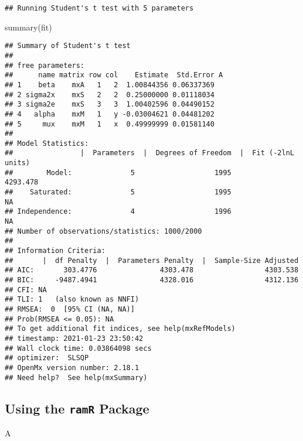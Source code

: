 \documentclass[
]{book}
\newenvironment{Shaded}{\begin{snugshade}}{\end{snugshade}}
\newcommand{\FunctionTok}[1]{\textcolor[rgb]{0.00,0.00,0.00}{#1}}
\newcommand{\NormalTok}[1]{#1}
\theoremstyle{definition}
\theoremstyle{definition}
\theoremstyle{definition}
\theoremstyle{remark}
\begin{document}
\begin{verbatim}
## Running Student's t test with 5 parameters
\end{verbatim}

\begin{Shaded}
\begin{Highlighting}[]
\FunctionTok{summary}\NormalTok{(fit)}
\end{Highlighting}
\end{Shaded}

\begin{verbatim}
## Summary of Student's t test 
##  
## free parameters:
##      name matrix row col    Estimate  Std.Error A
## 1    beta    mxA   1   2  1.00844356 0.06337369  
## 2 sigma2x    mxS   2   2  0.25000000 0.01118034  
## 3 sigma2e    mxS   3   3  1.00402596 0.04490152  
## 4   alpha    mxM   1   y -0.03004621 0.04481202  
## 5     mux    mxM   1   x  0.49999999 0.01581140  
## 
## Model Statistics: 
##                |  Parameters  |  Degrees of Freedom  |  Fit (-2lnL units)
##        Model:              5                   1995              4293.478
##    Saturated:              5                   1995                    NA
## Independence:              4                   1996                    NA
## Number of observations/statistics: 1000/2000
## 
## Information Criteria: 
##       |  df Penalty  |  Parameters Penalty  |  Sample-Size Adjusted
## AIC:       303.4776               4303.478                 4303.538
## BIC:     -9487.4941               4328.016                 4312.136
## CFI: NA 
## TLI: 1   (also known as NNFI) 
## RMSEA:  0  [95% CI (NA, NA)]
## Prob(RMSEA <= 0.05): NA
## To get additional fit indices, see help(mxRefModels)
## timestamp: 2021-01-23 23:50:42 
## Wall clock time: 0.03864098 secs 
## optimizer:  SLSQP 
## OpenMx version number: 2.18.1 
## Need help?  See help(mxSummary)
\end{verbatim}

\hypertarget{using-the-ramr-package-1}{%
\subsection{\texorpdfstring{Using the \texttt{ramR} Package}{Using the ramR Package}}\label{using-the-ramr-package-1}}

\begin{Shaded}
\begin{Highlighting}[]
\NormalTok{A}
\end{Highlighting}
\end{Shaded}
\end{document}
